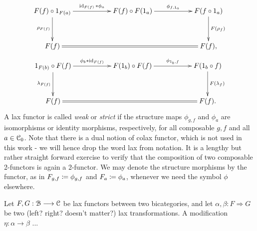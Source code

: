 \begin{defn}
\begin{gather*}
      \xymatrix@C+3em@R+1em{
        F(f) \circ 1_{F(a)}
          \ar[r]^-{\id_{F(f)} \ast \phi_a}
          \ar[d]_{\rho_{F(f)}}
        &
        F(f) \circ F(1_a)
          \ar[r]^-{\phi_{f,1_a}}
        &
        F(f \circ 1_a)
          \ar[d]^{F(\rho_f)}
        \\
        F(f)
          \ar@{=}[rr]
        &
        &
        F(f),
      }
    \end{gather*}
    \begin{gather*}
      \xymatrix@C+3em@R+1em{
        1_{F(b)} \circ F(f)
          \ar[r]^-{\phi_b \ast \id_{F(f)}}
          \ar[d]_{\lambda_{F(f)}}
        &
        F(1_b) \circ F(f)
          \ar[r]^-{\phi_{1_b,f}}
        &
        F(1_b \circ f)
          \ar[d]^{F(\lambda_f)}
        \\
        F(f)
          \ar@{=}[rr]
        &
        &
        F(f).
       }
    \end{gather*}
    A lax functor is called \emph{weak} or \emph{strict} if the structure maps $\phi_{g,f}$ and $\phi_a$ are isomorphisms or identity morphisms, respectively, for all composable $g,f$ and all $a \in \mathcal{C}_0$. 
    Note that there is a dual notion of colax functor, which is not used in this work - we will hence drop the word lax from notation. 
    It is a lengthy but rather straight forward exercise to verify that the composition of two composable 2-functors is again a 2-functor. 
    We may denote the structure morphisms by the functor, as in $F_{g,f} \coloneqq \phi_{g,f}$ and $F_a \coloneqq \phi_a$, whenever we need the symbol $\phi$ elsewhere.
  \end{defn}

  \begin{defn}\label{def_modification}
  Let $F,G: \mathcal{B} \longrightarrow \mathcal{C}$ be lax functors between two bicategories, and let $\alpha,\beta: F \Rightarrow G$ be two (left? right? doesn't matter?) lax transformations. A modification $\eta: \alpha \to \beta$ ...
  \end{defn}


